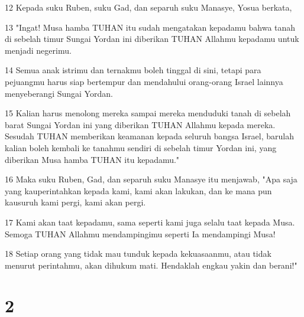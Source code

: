 \par 12 Kepada suku Ruben, suku Gad, dan separuh suku Manasye, Yosua berkata,
\par 13 "Ingat! Musa hamba TUHAN itu sudah mengatakan kepadamu bahwa tanah di sebelah timur Sungai Yordan ini diberikan TUHAN Allahmu kepadamu untuk menjadi negerimu.
\par 14 Semua anak istrimu dan ternakmu boleh tinggal di sini, tetapi para pejuangmu harus siap bertempur dan mendahului orang-orang Israel lainnya menyeberangi Sungai Yordan.
\par 15 Kalian harus menolong mereka sampai mereka menduduki tanah di sebelah barat Sungai Yordan ini yang diberikan TUHAN Allahmu kepada mereka. Sesudah TUHAN memberikan keamanan kepada seluruh bangsa Israel, barulah kalian boleh kembali ke tanahmu sendiri di sebelah timur Yordan ini, yang diberikan Musa hamba TUHAN itu kepadamu."
\par 16 Maka suku Ruben, Gad, dan separuh suku Manasye itu menjawab, "Apa saja yang kauperintahkan kepada kami, kami akan lakukan, dan ke mana pun kausuruh kami pergi, kami akan pergi.
\par 17 Kami akan taat kepadamu, sama seperti kami juga selalu taat kepada Musa. Semoga TUHAN Allahmu mendampingimu seperti Ia mendampingi Musa!
\par 18 Setiap orang yang tidak mau tunduk kepada kekuasaanmu, atau tidak menurut perintahmu, akan dihukum mati. Hendaklah engkau yakin dan berani!"

\chapter{2}

